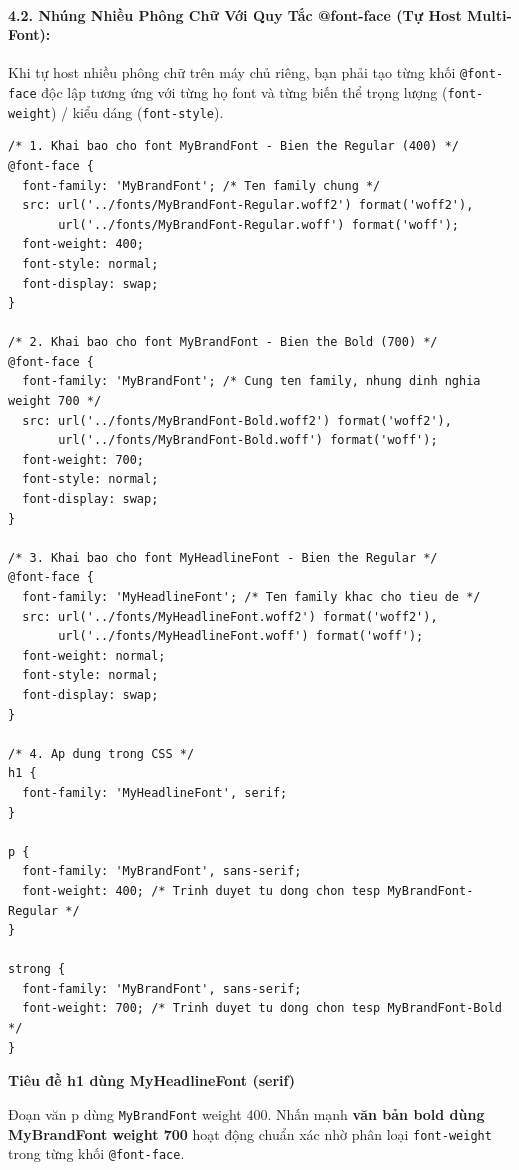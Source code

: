 \documentclass[11pt,oneside]{book}
\newcommand{\codeinline}[1]{\textcolor{accentOrange}{\texttt{#1}}}
\begin{document}
\paragraph{4.2. Nhúng Nhiều Phông Chữ Với Quy Tắc @font-face (Tự Host Multi-Font):}

Khi tự host nhiều phông chữ trên máy chủ riêng, bạn phải tạo từng khối \codeinline{@font-face} độc lập tương ứng với từng họ font và từng biến thể trọng lượng (\codeinline{font-weight}) / kiểu dáng (\codeinline{font-style}).

\begin{codeWindow}
\begin{lstlisting}[language=CSS3]
/* 1. Khai bao cho font MyBrandFont - Bien the Regular (400) */
@font-face {
  font-family: 'MyBrandFont'; /* Ten family chung */
  src: url('../fonts/MyBrandFont-Regular.woff2') format('woff2'),
       url('../fonts/MyBrandFont-Regular.woff') format('woff');
  font-weight: 400;
  font-style: normal;
  font-display: swap;
}

/* 2. Khai bao cho font MyBrandFont - Bien the Bold (700) */
@font-face {
  font-family: 'MyBrandFont'; /* Cung ten family, nhung dinh nghia weight 700 */
  src: url('../fonts/MyBrandFont-Bold.woff2') format('woff2'),
       url('../fonts/MyBrandFont-Bold.woff') format('woff');
  font-weight: 700;
  font-style: normal;
  font-display: swap;
}

/* 3. Khai bao cho font MyHeadlineFont - Bien the Regular */
@font-face {
  font-family: 'MyHeadlineFont'; /* Ten family khac cho tieu de */
  src: url('../fonts/MyHeadlineFont.woff2') format('woff2'),
       url('../fonts/MyHeadlineFont.woff') format('woff');
  font-weight: normal;
  font-style: normal;
  font-display: swap;
}

/* 4. Ap dung trong CSS */
h1 {
  font-family: 'MyHeadlineFont', serif;
}

p {
  font-family: 'MyBrandFont', sans-serif;
  font-weight: 400; /* Trinh duyet tu dong chon tesp MyBrandFont-Regular */
}

strong {
  font-family: 'MyBrandFont', sans-serif;
  font-weight: 700; /* Trinh duyet tu dong chon tesp MyBrandFont-Bold */
}
\end{lstlisting}
\end{codeWindow}

\begin{browserWindow}
\begin{tcolorbox}[arc=4pt, colback=white, colframe=primaryBlue!30, boxrule=0.8pt, top=10pt, bottom=10pt, left=12pt, right=12pt]
  {\sffamily\bfseries\color{primaryBlue}\Large Tiêu đề h1 dùng MyHeadlineFont (serif)}\par\vspace{6pt}
  {\sffamily\small Đoạn văn p dùng \codeinline{MyBrandFont} weight 400. Nhấn mạnh \textbf{văn bản bold dùng MyBrandFont weight 700} hoạt động chuẩn xác nhờ phân loại \codeinline{font-weight} trong từng khối \codeinline{@font-face}.}
\end{tcolorbox}
\end{browserWindow}
\end{document}
